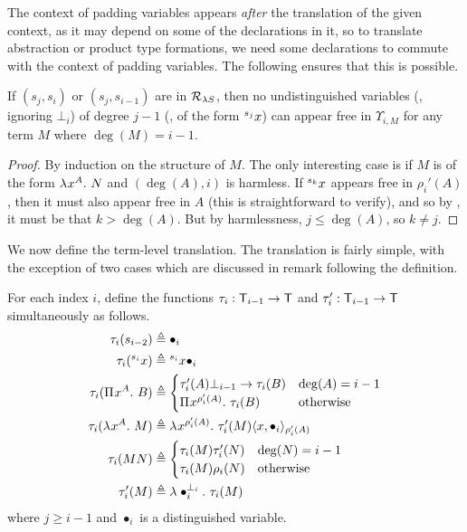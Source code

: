 \documentclass{article}
\begin{document}
The context of padding variables appears \textit{after} the translation of the given context, as it may depend on some of the declarations in it, so to translate abstraction or product type formations, we need some declarations to commute with the context of padding variables.
The following ensures that this is possible.

\begin{lemma}
\label{lem:free-var-upsilon}
If $(s_j, s_i)$ or $(s_j, s_{i - 1})$ are in $\rules_{\lS}$, then no undistinguished variables (\ie, ignoring $\bot_i$) of degree $j - 1$ (\ie, of the form $\svar j x$) can appear free in $\Upsilon_{i, M}$ for any term $M$ where $\deg(M) = i - 1$.
\end{lemma}

\begin{proof}
By induction on the structure of $M$.
The only interesting case is if $M$ is of the form $\lambdaT x A N$ and $(\deg(A), i)$ is harmless.
If $\svar k x$ appears free in $\rho_i'(A)$, then it must also appear free in $A$ (this is straightforward to verify), and so by , it must be that $k > \deg(A)$.
But by harmlessness, $j \leq \deg(A)$, so $k \not = j$.
\end{proof}

We now define the term-level translation.
The translation is fairly simple, with the exception of two cases which are discussed in remark following the definition.

\begin{definition}\label{def:tau}
For each index $i$, define the functions $\tau_i : \terms_{i - 1} \to \terms$ and $\tau_i' : \terms_{i - 1} \to \terms$ simultaneously as follows.
\begin{align*}
\tau_i(s_{i - 2}) &\df \bullet_i \\
\tau_i(\svar i x) &\df \svar i x \bullet_i \\
\tau_i(\PiT x A B) &\df
\begin{cases}
    \tau_i'(A)\bot_{i - 1} \to \tau_i(B) & \deg(A) = i - 1 \\
    \PiT x {\rho_i'(A)} {\tau_i(B)} & \ow
\end{cases} \\
\tau_i(\lambdaT x A M) &\df
\lambdaT x {\rho_i'(A)} {\tau_i'(M)\pair[\rho_i'(A)] x {\bullet_i}} \\
\tau_i(MN) &\df
\begin{cases}
    \tau_i(M)\tau_i'(N) & \deg(N) = i - 1 \\
    \tau_i(M)\rho_i(N) & \ow
\end{cases} \\
\tau'_i(M) &\df \lambdaT {\bullet_i} {\bot_i} \tau_i(M)
\end{align*}
where $j \geq i - 1$ and $\bullet_i$ is a distinguished variable.
\end{definition}
\end{document}
